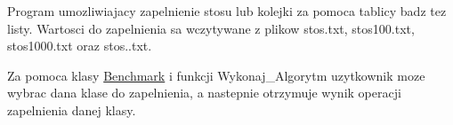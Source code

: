 \-Program umozliwiajacy zapelnienie stosu lub kolejki za pomoca tablicy badz tez listy. \-Wartosci do zapelnienia sa wczytywane z plikow stos.\-txt, stos100.\-txt, stos1000.\-txt oraz stos..\-txt.

\-Za pomoca klasy \hyperlink{class_benchmark}{\-Benchmark} i funkcji \-Wykonaj\-\_\-\-Algorytm uzytkownik moze wybrac dana klase do zapelnienia, a nastepnie otrzymuje wynik operacji zapelnienia danej klasy. 